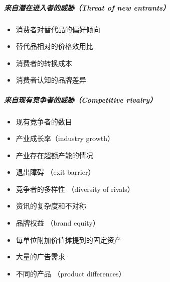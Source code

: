 \documentclass[letterpaper,10pt,english]{sphinxmanual}
\begin{document}
\subparagraph{来自潜在进入者的威胁（Threat of new entrants）}
\label{\detokenize{chapter_knowledge/BRD:threat-of-new-entrants}}\begin{itemize}
\item {} 
消费者对替代品的偏好倾向

\item {} 
替代品相对的价格效用比

\item {} 
消费者的转换成本

\item {} 
消费者认知的品牌差异

\end{itemize}


\subparagraph{来自现有竞争者的威胁（Competitive rivalry）}
\label{\detokenize{chapter_knowledge/BRD:competitive-rivalry}}\begin{itemize}
\item {} 
现有竞争者的数目

\item {} 
产业成长率（industry growth）

\item {} 
产业存在超额产能的情况

\item {} 
退出障碍 （exit barrier）

\item {} 
竞争者的多样性 （diversity of rivals）

\item {} 
资讯的复杂度和不对称

\item {} 
品牌权益 （brand equity）

\item {} 
每单位附加价值摊提到的固定资产

\item {} 
大量的广告需求

\item {} 
不同的产品 （product differences）

\end{itemize}
\end{document}
